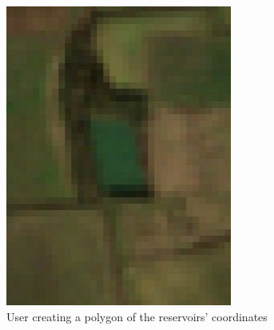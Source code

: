 \begin{figure}
\begin{subfigure}[b]{0.3\textwidth}
         \centering
         \includegraphics[width=\linewidth]{contents/figures/LR 10m res.jpg}
         \caption{User creating a polygon of the reservoirs' coordinates}
         \label{fig:ipdgs ui polygon}
     \end{subfigure}
     \hfill
     \begin{subfigure}[b]{0.3\textwidth}
         \centering

\end{subfigure}
\end{figure}
